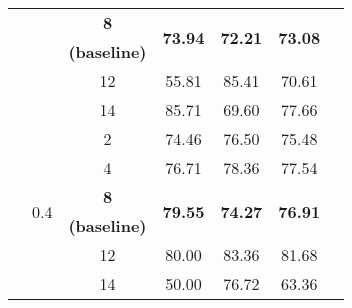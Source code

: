 \begin{sidewaystable}
\begin{adjustbox}{totalheight=0.85\textheight, width=\textwidth, keepaspectratio}
\begin{tabularx}{1.4\textwidth}{Xcccccc}
                                                       &                       & \textbf{8}               & \multirow{2}{*}{\textbf{73.94}} & \multirow{2}{*}{\textbf{72.21}} & \multirow{2}{*}{\textbf{73.08}} &                                 \\
                                                       &                       & \textbf{(baseline)}      &                                 &                                 &                                 &                                 \\ 
                                                       &                       & 12                       & 55.81                           & 85.41                           & 70.61                           &                                 \\ 
                                                       &                       & 14                       & 85.71                           & 69.60                            & 77.66                           &                                 \\ 
                                                       & \multirow{6}{*}{0.4}  & 2                        & 74.46                           & 76.50                            & 75.48                           &                                 \\ 
                                                       &                       & 4                        & 76.71                           & 78.36                           & 77.54                           &                                 \\ 
                                                       &                       & \textbf{8}               & \multirow{2}{*}{\textbf{79.55}} & \multirow{2}{*}{\textbf{74.27}} & \multirow{2}{*}{\textbf{76.91}} &                                 \\
                                                       &                       & \textbf{(baseline)}      &                                 &                                 &                                 &                                 \\ 
                                                       &                       & 12                       & 80.00                              & 83.36                           & 81.68                           &                                 \\ 
                                                       &                       & 14                       & 50.00                              & 76.72                           & 63.36                           &                                 \\ 

\end{tabularx}
\end{adjustbox}
\end{sidewaystable}
